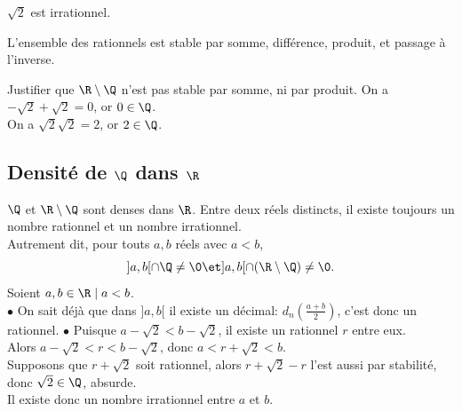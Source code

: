 \documentclass[11pt]{article}
\begin{document}
\vspace*{-0.5cm}

\begin{prop}{}{}
    $\sqrt{2}$ est irrationnel.
\end{prop}

\vspace*{-0.5cm}

\begin{prop}{}{}
    L'ensemble des rationnels est stable par somme, différence, produit, et passage à l'inverse.
\end{prop}

\vspace*{-0.5cm}

\begin{ex}{}{}
    Justifier que $\R\setminus\Q$ n'est pas stable par somme, ni par produit.
    \tcblower
    On a $-\sqrt{2}+\sqrt{2}=0$, or $0\in\Q$.\\
    On a $\sqrt{2}\sqrt{2}=2$, or $2\in\Q$.
\end{ex}

\subsection{Densité de \texorpdfstring{$\Q$}{Lg} dans \texorpdfstring{$\R$}{Lg}}

\begin{thm}{$\Q$ et $\R\setminus\Q$ sont denses dans $\R$.}{}
    Entre deux réels distincts, il existe toujours un nombre rationnel et un nombre irrationnel.\\
    Autrement dit, pour touts $a,b$ réels avec $a<b$,
    \begin{equation*}
        ]a,b[\cap\Q\neq\0\et]a,b[\cap(\R\setminus\Q)\neq\0.
    \end{equation*}
    \tcblower
    Soient $a,b\in\R\mid a<b$.\\
    $\bullet$ On sait déjà que dans $]a,b[$ il existe un décimal: $d_n(\frac{a+b}{2})$, c'est donc un rationnel.\n
    $\bullet$ Puisque $a-\sqrt{2}<b-\sqrt{2}$, il existe un rationnel $r$ entre eux.\\
    Alors $a-\sqrt{2}<r<b-\sqrt{2}$, donc $a<r+\sqrt{2}<b$.\\
    Supposons que $r+\sqrt{2}$ soit rationnel, alors $r+\sqrt{2}-r$ l'est aussi par stabilité, donc $\sqrt{2}\in\Q$, absurde.\\
    Il existe donc un nombre irrationnel entre $a$ et $b$.
\end{thm}

\vspace*{-0.5cm}
\end{document}
